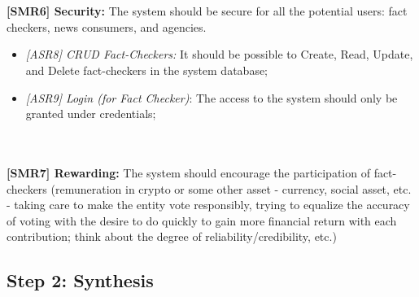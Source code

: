 \\\\
\noindent\textbf{[SMR6] Security:} The system should be secure for all the potential users: fact checkers, news consumers, and agencies.  
\begin{itemize}
            \item\textit{[ASR8] CRUD Fact-Checkers:} It should be possible to Create, Read, Update, and Delete fact-checkers in the system database;
            \item\textit{[ASR9] Login (for Fact Checker)}: The access to the system should only be granted under credentials;           
\end{itemize}
\\\\
\noindent\textbf{[SMR7] Rewarding:} The system should encourage the participation of fact-checkers (remuneration in crypto or some other asset - currency, social asset, etc. - taking care to make the entity vote responsibly, trying to equalize the accuracy of voting with the desire to do quickly to gain more financial return with each contribution; think about the degree of reliability/credibility, etc.)




\subsection{Step 2: Synthesis}

